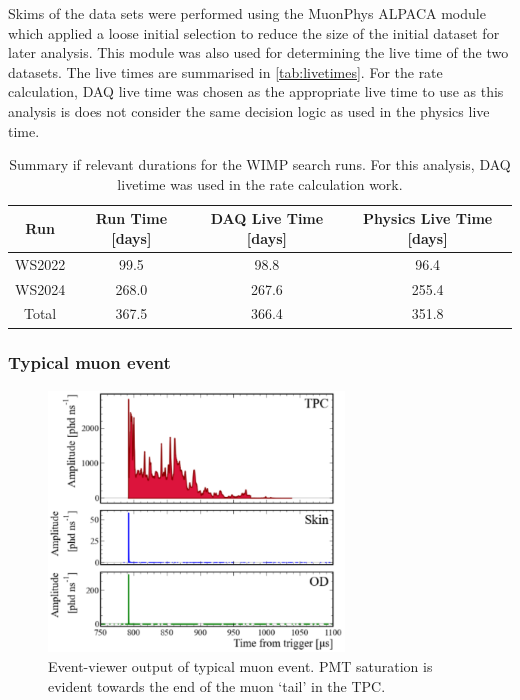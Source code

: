 Skims of the data sets were performed using the {\selectfont MuonPhys} ALPACA module which applied a loose initial selection to reduce the size of the initial dataset for later analysis. This module was also used for determining the live time of the two datasets. The live times are summarised in \autoref{tab:livetimes}. For the rate calculation, DAQ live time was chosen as the appropriate live time to use as this analysis is does not consider the same decision logic as used in the physics live time.

\begin{table}[htbp]
    \centering
    \caption{Summary if relevant durations for the WIMP search runs. For this analysis, DAQ livetime was used in the rate calculation work.}
    \begin{tabular}{|c|c|c|c|}
        \hline
        \textbf{Run} & \textbf{Run Time [days]} & \textbf{DAQ Live Time [days]} & \textbf{Physics Live Time [days]} \\
        \hline
        WS2022 & 99.5 & 98.8 & 96.4 \\
        WS2024 & 268.0 & 267.6 & 255.4 \\
        Total & 367.5 & 366.4 & 351.8 \\
        \hline
    \end{tabular}
    \label{tab:livetimes}
\end{table}

\subsubsection{Typical muon event}
\begin{figure}[htbp]
    \centering \includegraphics[width=0.7\textwidth]{figures/Muons/LZap_waveform.pdf}
    \caption{Event-viewer output of typical muon event. PMT saturation is evident towards the end of the muon ‘tail’ in the TPC.}
    \label{fig:eventViewer}
\end{figure}

